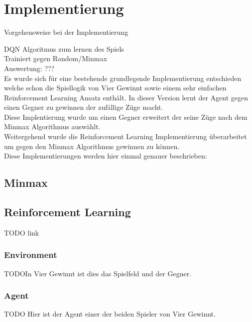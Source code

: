 \chapter{Implementierung}%

\label{cha:Implementierung}

Vorgehensweise bei der Implementierung

\colorbox{red!30}{DQN Algoritmus zum lernen des Spiels}\\

\colorbox{red!30}{Trainiert gegen Random/Minmax}\\

\colorbox{red!30}{Auswertung: ???}\\


Es wurde sich für eine bestehende grundlegende Implementierung entschieden welche schon die Spiellogik von Vier Gewinnt sowie einem sehr einfachen Reinforcement Learning Ansatz enthält. In dieser Version lernt der Agent gegen einen Gegner zu gewinnen der zufällige Züge macht.\\
Diese Implentierung wurde um einen Gegner erweitert der seine Züge nach dem Minmax Algorithmus auswählt.\\
Weitergehend wurde die Reinforcement Learning Implementierung überarbeitet um gegen den Minmax Algorithmus gewinnen zu können.\\
Diese Implementierungen werden hier einmal genauer beschrieben:\\

\section{Minmax}

\section{Reinforcement Learning}
\colorbox{red!30}{TODO link}

\subsection{Environment}
\colorbox{red!30}{TODO}In Vier Gewinnt ist dies das Spielfeld und der Gegner. 

\subsection{Agent}
\colorbox{red!30}{TODO} Hier ist der Agent einer der beiden Spieler von Vier Gewinnt.

